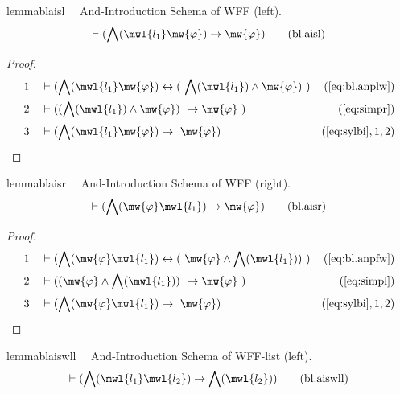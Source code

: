 \begin{restatable}{lemma}{blaisl}~~ And-Introduction Schema of WFF (left).
\begin{align}
\vdash ( \bigwedge( \mwl{l_1} \mw{\varphi} ) \rightarrow \mw{\varphi}
    )\label{eq:bl.aisl}\tag{bl.aisl}
\end{align}
\end{restatable}

\begin{proof}
\begin{align}
  1 &&  & \vdash ( \bigwedge( \mwl{l_1} \mw{\varphi} ) \leftrightarrow (
     ~\bigwedge( \mwl{l_1} ) \wedge \mw{\varphi} )
     ~)&(\mbox{\ref{eq:bl.anplw}})\notag
  \\ 2 &&  & \vdash ( ( \bigwedge( \mwl{l_1} ) \wedge \mw{\varphi} )
     ~\rightarrow \mw{\varphi}
     ~)&(\mbox{\ref{eq:simpr}})\notag
  \\ 3 &&  & \vdash ( \bigwedge( \mwl{l_1} \mw{\varphi} ) \rightarrow
     ~\mw{\varphi} )&(\mbox{\ref{eq:sylbi}},1,2)\notag
\end{align}
\end{proof}

\begin{restatable}{lemma}{blaisr}~~ And-Introduction Schema of WFF (right).
\begin{align}
\vdash ( \bigwedge( \mw{\varphi} \mwl{l_1} ) \rightarrow \mw{\varphi}
    )\label{eq:bl.aisr}\tag{bl.aisr}
\end{align}
\end{restatable}

\begin{proof}
\begin{align}
  1 &&  & \vdash ( \bigwedge( \mw{\varphi} \mwl{l_1} ) \leftrightarrow (
     ~\mw{\varphi} \wedge \bigwedge( \mwl{l_1} ) )
     ~)&(\mbox{\ref{eq:bl.anpfw}})\notag
  \\ 2 &&  & \vdash ( ( \mw{\varphi} \wedge \bigwedge( \mwl{l_1} ) )
     ~\rightarrow \mw{\varphi}
     ~)&(\mbox{\ref{eq:simpl}})\notag
  \\ 3 &&  & \vdash ( \bigwedge( \mw{\varphi} \mwl{l_1} ) \rightarrow
     ~\mw{\varphi} )&(\mbox{\ref{eq:sylbi}},1,2)\notag
\end{align}
\end{proof}

\begin{restatable}{lemma}{blaiswll}~~ And-Introduction Schema of WFF-list
(left).
\begin{align}
\vdash ( \bigwedge( \mwl{l_1} \mwl{l_2} ) \rightarrow \bigwedge( \mwl{l_2} )
    )\label{eq:bl.aiswll}\tag{bl.aiswll}
\end{align}
\end{restatable}

